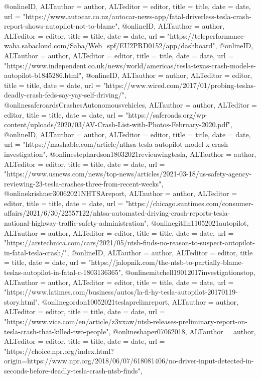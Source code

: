 {{{@online{ID,	ALTauthor = {author},	ALTeditor = {editor},	title = {title},	date = {date},	url = {"https://www.autocar.co.nz/autocar-news-app/fatal-driverless-tesla-crash-report-shows-autopilot-not-to-blame"},}
@online{ID,	ALTauthor = {author},	ALTeditor = {editor},	title = {title},	date = {date},	url = {"https://teleperformance-waha.sabacloud.com/Saba/Web_spf/EU2PRD0152/app/dashboard"},}
@online{ID,	ALTauthor = {author},	ALTeditor = {editor},	title = {title},	date = {date},	url = {"https://www.independent.co.uk/news/world/americas/tesla-texas-crash-model-s-autopilot-b1845286.html"},}
@online{ID,	ALTauthor = {author},	ALTeditor = {editor},	title = {title},	date = {date},	url = {"https://www.wired.com/2017/01/probing-teslas-deadly-crash-feds-say-yay-self-driving/"},}
@online{saferoardsCrashesAutonomousvehicles,	ALTauthor = {author},	ALTeditor = {editor},	title = {title},	date = {date},	url = {"https://saferoads.org/wp-content/uploads/2020/03/AV-Crash-List-with-Photos-February-2020.pdf"},}
@online{ID,	ALTauthor = {author},	ALTeditor = {editor},	title = {title},	date = {date},	url = {"https://mashable.com/article/nthsa-tesla-autopilot-model-x-crash-investigation"},}
@online{stephardson18032021revieuwingtesla,	ALTauthor = {author},	ALTeditor = {editor},	title = {title},	date = {date},	url = {"https://www.usnews.com/news/top-news/articles/2021-03-18/us-safety-agency-reviewing-23-tesla-crashes-three-from-recent-weeks"},}
@online{krishner30062021NHTSAreport,	ALTauthor = {author},	ALTeditor = {editor},	title = {title},	date = {date},	url = {"https://chicago.suntimes.com/consumer-affairs/2021/6/30/22557122/nhtsa-automated-driving-crash-reports-tesla-national-highway-traffic-safety-administration"},}
@online{gitlin11052021autopilot,	ALTauthor = {author},	ALTeditor = {editor},	title = {title},	date = {date},	url = {"https://arstechnica.com/cars/2021/05/ntsb-finds-no-reason-to-suspect-autopilot-in-fatal-tesla-crash/"},}
@online{ID,	ALTauthor = {author},	ALTeditor = {editor},	title = {title},	date = {date},	url = {"https://jalopnik.com/the-ntsb-to-partially-blame-teslas-autopilot-in-fatal-c-1803136365"},}
@online{mitchell19012017investigationstop,	ALTauthor = {author},	ALTeditor = {editor},	title = {title},	date = {date},	url = {"https://www.latimes.com/business/autos/la-fi-hy-tesla-autopilot-20170119-story.html"},}
@online{gordon10052021teslaprelimreport,	ALTauthor = {author},	ALTeditor = {editor},	title = {title},	date = {date},	url = {"https://www.vice.com/en/article/z3xxaw/ntsb-releases-preliminary-report-on-tesla-crash-that-killed-two-people"},}
@online{shaper07062018,	ALTauthor = {author},	ALTeditor = {editor},	title = {title},	date = {date},	url = {"https://choice.npr.org/index.html?origin=https://www.npr.org/2018/06/07/618081406/no-driver-input-detected-in-seconds-before-deadly-tesla-crash-ntsb-finds"},}
}}}
